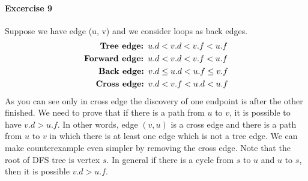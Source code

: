 \documentclass{book}
\begin{document}
	\paragraph{Excercise 9}
	Suppose we have edge (u, v) and we consider loops as back edges.
	\begin{align*}	
	\begin{split}
	\text{\textbf{Tree edge: }} u.d &< v.d < v.f < u.f \\
	\text{\textbf{Forward edge: }} u.d &< v.d < v.f < u.f \\
	\text{\textbf{Back edge: }} v.d &\le u.d < u.f \le v.f \\
	\text{\textbf{Cross edge: }} v.d &< v.f < u.d < u.f \\
	\end{split}
	\end{align*}
	As you can see only in cross edge the discovery of one endpoint is after the other finished. We need to prove that if there is a path from $u$ to $v$, it is possible to have $v.d > u.f$. In other words, edge $(v, u)$ is a cross edge and there is a path from $u$ to $v$ in which there is at least one edge which is not a tree edge. We can make counterexample even simpler by removing the cross edge. Note that the root of DFS tree is vertex $s$. In general if there is a cycle from $s$ to $u$ and $u$ to $s$, then it is possible $v.d > u.f$.
	
\end{document}
